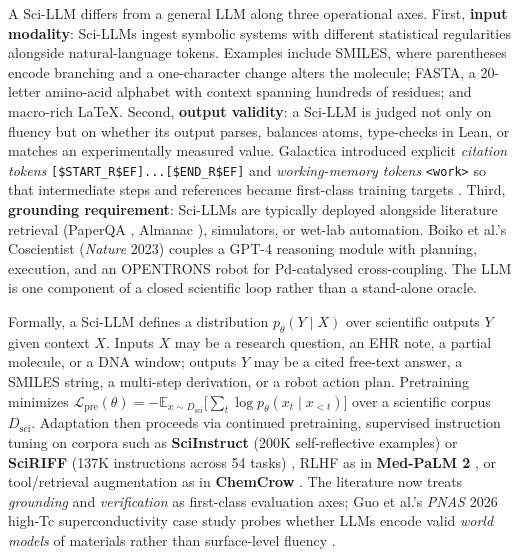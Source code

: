 \documentclass{article}
\begin{document}
A Sci-LLM differs from a general LLM along three operational axes. First, \textbf{input modality}: Sci-LLMs ingest symbolic systems with different statistical regularities alongside natural-language tokens. Examples include SMILES, where parentheses encode branching and a one-character change alters the molecule; FASTA, a 20-letter amino-acid alphabet with context spanning hundreds of residues; and macro-rich LaTeX. Second, \textbf{output validity}: a Sci-LLM is judged not only on fluency but on whether its output parses, balances atoms, type-checks in Lean, or matches an experimentally measured value. Galactica introduced explicit \emph{citation tokens} \texttt{{[}\$START\_R\$EF{]}...{[}\$END\_R\$EF{]}} and \emph{working-memory tokens} \texttt{\textless{}work\textgreater{}} so that intermediate steps and references became first-class training targets \cite{taylor2022arxiv2211090852022}. Third, \textbf{grounding requirement}: Sci-LLMs are typically deployed alongside literature retrieval (PaperQA \cite{ala2023arxiv2312075592023}, Almanac \cite{zakka2024almanacretrievalau}), simulators, or wet-lab automation. Boiko et al.'s Coscientist (\emph{Nature} 2023) \cite{boiko2023nature6242023} couples a GPT-4 reasoning module with planning, execution, and an OPENTRONS robot for Pd-catalysed cross-coupling. The LLM is one component of a closed scientific loop rather than a stand-alone oracle.

Formally, a Sci-LLM defines a distribution \(p_\theta(Y \mid X)\) over scientific outputs \(Y\) given context \(X\). Inputs \(X\) may be a research question, an EHR note, a partial molecule, or a DNA window; outputs \(Y\) may be a cited free-text answer, a SMILES string, a multi-step derivation, or a robot action plan. Pretraining minimizes \(\mathcal{L}_{\text{pre}}(\theta) = -\mathbb{E}_{x \sim D_{\text{sci}}}\big[\sum_t \log p_\theta(x_t \mid x_{<t})\big]\) over a scientific corpus \(D_{\text{sci}}\). Adaptation then proceeds via continued pretraining, supervised instruction tuning on corpora such as \textbf{SciInstruct} (200K self-reflective examples) \cite{zhang2024sciinstructaselfre} or \textbf{SciRIFF} (137K instructions across 54 tasks) \cite{wadden2024sciriffaresourceto}, RLHF as in \textbf{Med-PaLM 2} \cite{singhal2025towardexpertlevelm}, or tool/retrieval augmentation as in \textbf{ChemCrow} \cite{bran2024naturemachineintel}. The literature now treats \emph{grounding} and \emph{verification} as first-class evaluation axes; Guo et al.'s \emph{PNAS} 2026 high-Tc superconductivity case study probes whether LLMs encode valid \emph{world models} of materials rather than surface-level fluency \cite{guo2026expertevaluationof}.
\end{document}
